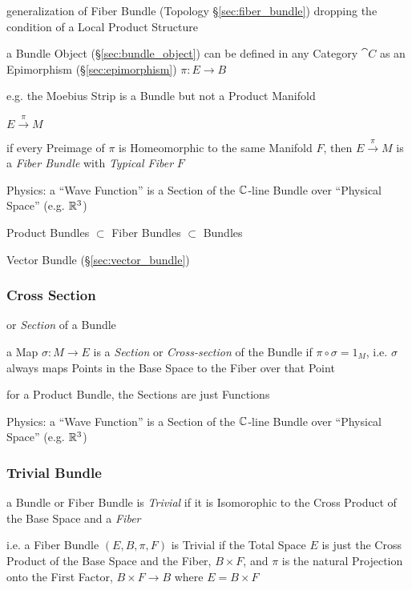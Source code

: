 generalization of Fiber Bundle (Topology \S\ref{sec:fiber_bundle}) dropping the
condition of a Local Product Structure

a Bundle Object (\S\ref{sec:bundle_object}) can be defined in any Category
$\cat{C}$ as an Epimorphism (\S\ref{sec:epimorphism}) $\pi : E \rightarrow B$

e.g. the Moebius Strip is a Bundle but not a Product Manifold

$E \xrightarrow{\pi} M$

if every Preimage of $\pi$ is Homeomorphic to the same Manifold $F$, then $E
\xrightarrow{\pi} M$ is a \emph{Fiber Bundle} with \emph{Typical Fiber} $F$

Physics: a ``Wave Function'' is a Section of the $\mathbb{C}$-line Bundle over
``Physical Space'' (e.g. $\mathbb{R}^3$)

Product Bundles $\subset$ Fiber Bundles $\subset$ Bundles

Vector Bundle (\S\ref{sec:vector_bundle})




\subsubsection{Cross Section}\label{sec:cross_section}

or \emph{Section} of a Bundle

a Map $\sigma : M \rightarrow E$ is a \emph{Section} or \emph{Cross-section} of
the Bundle if $\pi \circ \sigma = 1_M$, i.e. $\sigma$ always maps Points in the
Base Space to the Fiber over that Point

for a Product Bundle, the Sections are just Functions

Physics: a ``Wave Function'' is a Section of the $\mathbb{C}$-line Bundle over
``Physical Space'' (e.g. $\mathbb{R}^3$)



\subsubsection{Trivial Bundle}\label{sec:trivial_bundle}

a Bundle or Fiber Bundle is \emph{Trivial} if it is Isomorophic to the Cross
Product of the Base Space and a \emph{Fiber}

i.e. a Fiber Bundle $(E, B, \pi, F)$ is Trivial if the Total Space $E$ is just
the Cross Product of the Base Space and the Fiber, $B \times F$, and $\pi$ is
the natural Projection onto the First Factor, $B \times F \rightarrow B$ where
$E = B \times F$

